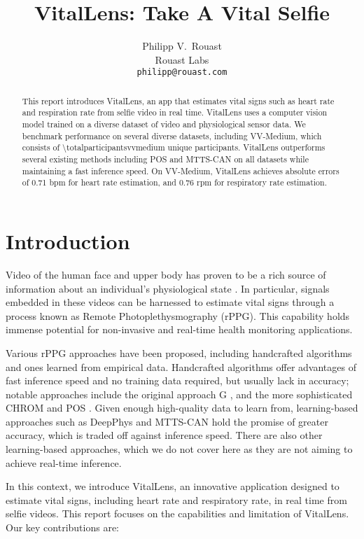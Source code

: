 \documentclass{article}
\title{VitalLens: Take A Vital Selfie}
\author{%
  Philipp V.~Rouast \\
  Rouast Labs\\
  \texttt{philipp@rouast.com} \\
}
\begin{document}
\maketitle


\begin{abstract}
This report introduces VitalLens, an app that estimates vital signs such as heart rate and respiration rate from selfie video in real time.
VitalLens uses a computer vision model trained on a diverse dataset of video and physiological sensor data.
We benchmark performance on several diverse datasets, including VV-Medium, which consists of \num{\totalparticipantsvvmedium} unique participants.
VitalLens outperforms several existing methods including POS and MTTS-CAN on all datasets while maintaining a fast inference speed.
On VV-Medium, VitalLens achieves absolute errors of 0.71 bpm for heart rate estimation, and 0.76 rpm for respiratory rate estimation.
\end{abstract}


\section{Introduction}
\label{sec:introduction}

Video of the human face and upper body has proven to be a rich source of information about an individual's physiological state \cite{verkruysse2008remote}.
In particular, signals embedded in these videos can be harnessed to estimate vital signs through a process known as Remote Photoplethysmography (rPPG).
This capability holds immense potential for non-invasive and real-time health monitoring applications.

Various rPPG approaches have been proposed, including handcrafted algorithms and ones learned from empirical data.
Handcrafted algorithms offer advantages of fast inference speed and no training data required, but usually lack in accuracy; notable approaches include the original approach G \cite{verkruysse2008remote}, and the more sophisticated CHROM \cite{de2013robust} and POS \cite{wang2017algorithmic}.
Given enough high-quality data to learn from, learning-based approaches such as DeepPhys \cite{chen2018deep} and MTTS-CAN \cite{liu2020multi} hold the promise of greater accuracy, which is traded off against inference speed.
There are also other learning-based approaches, which we do not cover here as they are not aiming to achieve real-time inference.

In this context, we introduce VitalLens, an innovative application designed to estimate vital signs, including heart rate and respiratory rate, in real time from selfie videos.
This report focuses on the capabilities and limitation of VitalLens.
Our key contributions are:
\end{document}
